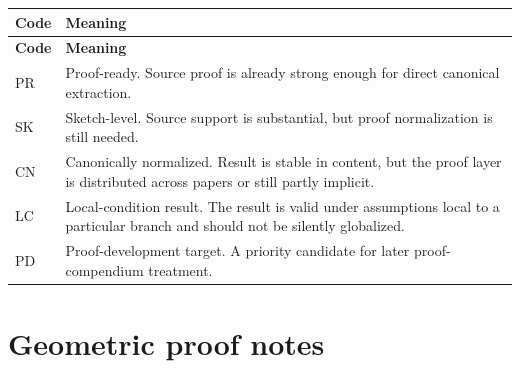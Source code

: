 \documentclass[12pt]{article}
\begin{document}
	\begin{longtable}{>{\RaggedRight\arraybackslash}p{}
			>{\RaggedRight\arraybackslash}p{}}
		\toprule
		\textbf{Code} & \textbf{Meaning} \\
		\midrule
		\endfirsthead
		\toprule
		\textbf{Code} & \textbf{Meaning} \\
		\midrule
		\endhead
		
		PR & Proof-ready. Source proof is already strong enough for direct canonical extraction. \\
		
		SK & Sketch-level. Source support is substantial, but proof normalization is still needed. \\
		
		CN & Canonically normalized. Result is stable in content, but the proof layer is distributed across papers or still partly implicit. \\
		
		LC & Local-condition result. The result is valid under assumptions local to a particular branch and should not be silently globalized. \\
		
		PD & Proof-development target. A priority candidate for later proof-compendium treatment. \\
		
		\bottomrule
	\end{longtable}
	
	\section{Geometric proof notes}
	
\end{document}
